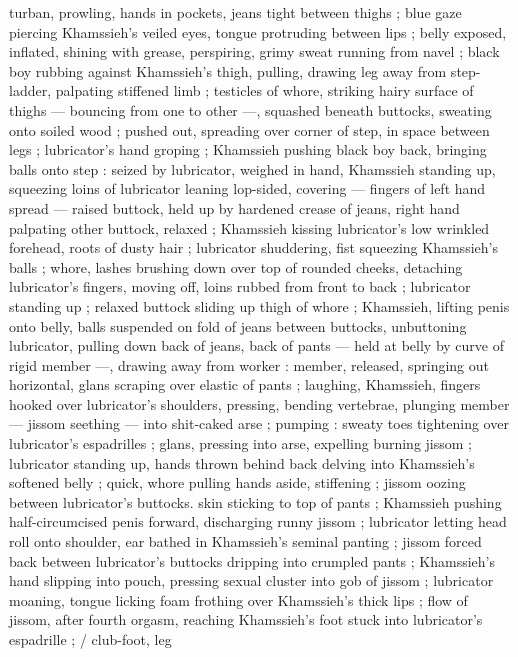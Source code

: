 turban, prowling, hands in pockets, jeans tight between thighs ; blue 
gaze piercing Khamssieh's veiled eyes, tongue protruding between 
lips ; belly exposed, inflated, shining with grease, perspiring, grimy 
sweat running from navel ; black boy rubbing against Khamssieh's 
thigh, pulling, drawing leg away from step-ladder, palpating stiffened 
limb ; testicles of whore, striking hairy surface of thighs --- bouncing 
from one to other ---, squashed beneath buttocks, sweating onto 
soiled wood ; pushed out, spreading over corner of step, in space 
between legs ; lubricator's hand groping ; Khamssieh pushing black 
boy back, bringing balls onto step : seized by lubricator, weighed in 
hand, Khamssieh standing up, squeezing loins of lubricator leaning 
lop-sided, covering --- fingers of left hand spread --- raised buttock, 
held up by hardened crease of jeans, right hand palpating other 
buttock, relaxed ; Khamssieh kissing lubricator's low wrinkled 
forehead, roots of dusty hair ; lubricator shuddering, fist squeezing 
Khamssieh's balls ; whore, lashes brushing down over top of 
rounded cheeks, detaching lubricator's fingers, moving off, loins 
rubbed from front to back ; lubricator standing up ; relaxed buttock 
sliding up thigh of whore ; Khamssieh, lifting penis onto belly, balls 
suspended on fold of jeans between buttocks, unbuttoning 
lubricator, pulling down back of jeans, back of pants --- held at belly 
by curve of rigid member ---, drawing away from worker : member, 
released, springing out horizontal, glans scraping over elastic of 
pants ; laughing, Khamssieh, fingers hooked over lubricator's 
shoulders, pressing, bending vertebrae, plunging member --- jissom 
seething --- into shit-caked arse ; pumping : sweaty toes tightening 
over lubricator's espadrilles ; glans, pressing into arse, expelling 
burning jissom ; lubricator standing up, hands thrown behind back 
delving into Khamssieh's softened belly ; quick, whore pulling hands 
aside, stiffening ; jissom oozing between lubricator's buttocks. skin 
sticking to top of pants ; Khamssieh pushing half-circumcised penis 
forward, discharging runny jissom ; lubricator letting head roll onto 
shoulder, ear bathed in Khamssieh's seminal panting ; jissom forced 
back between lubricator's buttocks dripping into crumpled pants ; 
Khamssieh's hand slipping into pouch, pressing sexual cluster into 
gob of jissom ; lubricator moaning, tongue licking foam frothing over 
Khamssieh's thick lips ; flow of jissom, after fourth orgasm, reaching 
Khamssieh's foot stuck into lubricator's espadrille ; {\slash} club-foot, leg 
